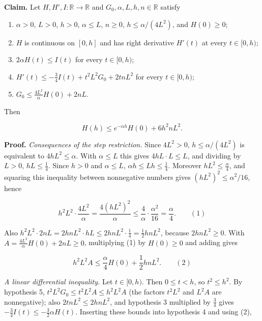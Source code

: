 \documentclass[11pt,a4paper]{report}
\begin{document}
\textbf{Claim.} Let \(H,H',I:\mathbb R\to\mathbb R\) and \(G_0,\alpha,L,h,n\in\mathbb R\) satisfy



\begin{enumerate}


\item \(\alpha>0\), \(L>0\), \(h>0\), \(\alpha\le L\), \(n\ge0\), \(h\le\alpha/(4L^2)\), and \(H(0)\ge0\);

\item \(H\) is continuous on \([0,h]\) and has right derivative \(H'(t)\) at every \(t\in[0,h)\);

\item \(2\alpha H(t)\le I(t)\) for every \(t\in[0,h)\);

\item \(H'(t)\le-\frac34I(t)+t^2L^2G_0+2tnL^2\) for every \(t\in[0,h)\);

\item \(G_0\le\frac{4L^2}{\alpha}H(0)+2nL\).

\end{enumerate}



Then


\[H(h)\le e^{-\alpha h}H(0)+6h^2nL^2.\]


\textbf{Proof.} \emph{Consequences of the step restriction.} Since \(4L^2>0\), \(h\le\alpha/(4L^2)\) is equivalent to \(4hL^2\le\alpha\). With \(\alpha\le L\) this gives \(4hL\cdot L\le L\), and dividing by \(L>0\), \(hL\le\frac14\). Since \(h>0\) and \(\alpha\le L\), \(\alpha h\le Lh\le\frac14\). Moreover \(hL^2\le\frac\alpha4\), and squaring this inequality between nonnegative numbers gives \((hL^2)^2\le\alpha^2/16\), hence


\[h^2L^2\cdot\frac{4L^2}{\alpha}=\frac{4(hL^2)^2}{\alpha}\le\frac{4}{\alpha}\cdot\frac{\alpha^2}{16}=\frac\alpha4.\qquad(1)\]


Also \(h^2L^2\cdot2nL=2hnL^2\cdot hL\le2hnL^2\cdot\frac14=\frac12hnL^2\), because \(2hnL^2\ge0\). With \(A=\frac{4L^2}{\alpha}H(0)+2nL\ge0\), multiplying (1) by \(H(0)\ge0\) and adding gives


\[h^2L^2A\le\frac\alpha4H(0)+\frac12hnL^2.\qquad(2)\]


\emph{A linear differential inequality.} Let \(t\in[0,h)\). Then \(0\le t<h\), so \(t^2\le h^2\). By hypothesis 5, \(t^2L^2G_0\le t^2L^2A\le h^2L^2A\) (the factors \(t^2L^2\) and \(L^2A\) are nonnegative); also \(2tnL^2\le2hnL^2\), and hypothesis 3 multiplied by \(\frac34\) gives \(-\frac34I(t)\le-\frac32\alpha H(t)\). Inserting these bounds into hypothesis 4 and using (2),
\end{document}
